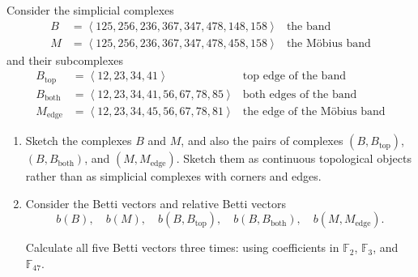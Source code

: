 \documentclass[12 pt, letterpaper]{hmcpset}
\begin{document}
\begin{problem}[68.]
	Consider the simplicial complexes
	\begin{align*}
		B & = \left < 125, 256, 236, 367, 347, 478, 148, 158 \right > & \text{the band} \\
		M & = \left < 125, 256, 236, 367, 347, 478, 458, 158 \right > & \text{the M\"obius band}
	\end{align*}
	and their subcomplexes
	\begin{align*}
		B_{\text{top}} & = \left < 12, 23, 34, 41 \right > & \text{top edge of the band} \\
		B_{\text{both}} & = \left < 12, 23, 34, 41, 56, 67, 78, 85 \right > & \text{both edges of the band} \\
		M_{\text{edge}} & = \left < 12, 23, 34, 45, 56, 67, 78, 81 \right > & \text{the edge of the M\"obius band}
	\end{align*}

	\begin{enumerate}
		\item Sketch the complexes $B$ and $M$, and also the pairs of complexes $(B, B_{\text{top}})$, $(B, B_{\text{both}})$, and $(M, M_{\text{edge}})$. Sketch them as continuous topological objects rather than as simplicial complexes with corners and edges.

		\item Consider the Betti vectors and relative Betti vectors
			\[
				b(B), \quad b(M), \quad b(B, B_{\text{top}}), \quad b(B, B_{\text{both}}), \quad b(M, M_{\text{edge}}).
			\]
			
			Calculate all five Betti vectors three times: using coefficients in $\mathbb{F}_{2}$, $\mathbb{F}_{3}$, and $\mathbb{F}_{47}$.
	\end{enumerate}
\end{problem}
\end{document}

